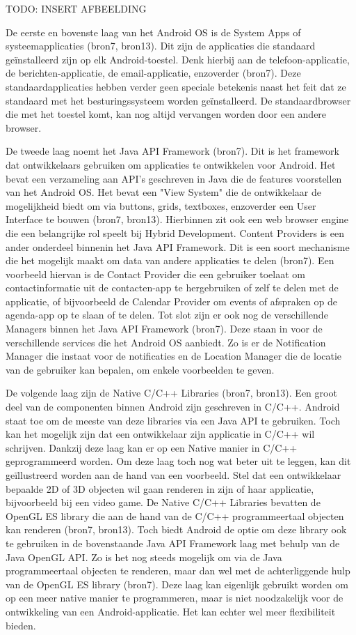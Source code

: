 TODO: INSERT AFBEELDING

De eerste en bovenste laag van het Android OS is de System Apps of systeemapplicaties (bron7, bron13). Dit zijn de applicaties die standaard geïnstalleerd zijn op elk Android-toestel. Denk hierbij aan de telefoon-applicatie, de berichten-applicatie, de email-applicatie, enzoverder (bron7). Deze standaardapplicaties hebben verder geen speciale betekenis naast het feit dat ze standaard met het besturingssysteem worden geïnstalleerd. De standaardbrowser die met het toestel komt, kan nog altijd vervangen worden door een andere browser.

De tweede laag noemt het Java API Framework (bron7). Dit is het framework dat ontwikkelaars gebruiken om applicaties te ontwikkelen voor Android. Het bevat een verzameling aan API's geschreven in Java die de features voorstellen van het Android OS. Het bevat een "View System" die de ontwikkelaar de mogelijkheid biedt om via buttons, grids, textboxes, enzoverder een User Interface te bouwen (bron7, bron13). Hierbinnen zit ook een web browser engine die een belangrijke rol speelt bij Hybrid Development. Content Providers is een ander onderdeel binnenin het Java API Framework. Dit is een soort mechanisme die het mogelijk maakt om data van andere applicaties te delen (bron7). Een voorbeeld hiervan is de Contact Provider die een gebruiker toelaat om contactinformatie uit de contacten-app te hergebruiken of zelf te delen met de applicatie, of bijvoorbeeld de Calendar Provider om events of afspraken op de agenda-app op te slaan of te delen. Tot slot zijn er ook nog de verschillende Managers binnen het Java API Framework (bron7). Deze staan in voor de verschillende services die het Android OS aanbiedt. Zo is er de Notification Manager die instaat voor de notificaties en de Location Manager die de locatie van de gebruiker kan bepalen, om enkele voorbeelden te geven.

De volgende laag zijn de Native C/C++ Libraries (bron7, bron13). Een groot deel van de componenten binnen Android zijn geschreven in C/C++. Android staat toe om de meeste van deze libraries via een Java API te gebruiken. Toch kan het mogelijk zijn dat een ontwikkelaar zijn applicatie in C/C++ wil schrijven. Dankzij deze laag kan er op een Native manier in C/C++ geprogrammeerd worden. Om deze laag toch nog wat beter uit te leggen, kan dit geïllustreerd worden aan de hand van een voorbeeld. Stel dat een ontwikkelaar bepaalde 2D of 3D objecten wil gaan renderen in zijn of haar applicatie, bijvoorbeeld bij een video game. De Native C/C++ Libraries bevatten de OpenGL ES library die aan de hand van de C/C++ programmeertaal objecten kan renderen (bron7, bron13). Toch biedt Android de optie om deze library ook te gebruiken in de bovenstaande Java API Framework laag met behulp van de Java OpenGL API. Zo is het nog steeds mogelijk om via de Java programmeertaal objecten te renderen, maar dan wel met de achterliggende hulp van de OpenGL ES library (bron7). Deze laag kan eigenlijk gebruikt worden om op een meer native manier te programmeren, maar is niet noodzakelijk voor de ontwikkeling van een Android-applicatie. Het kan echter wel meer flexibiliteit bieden.

